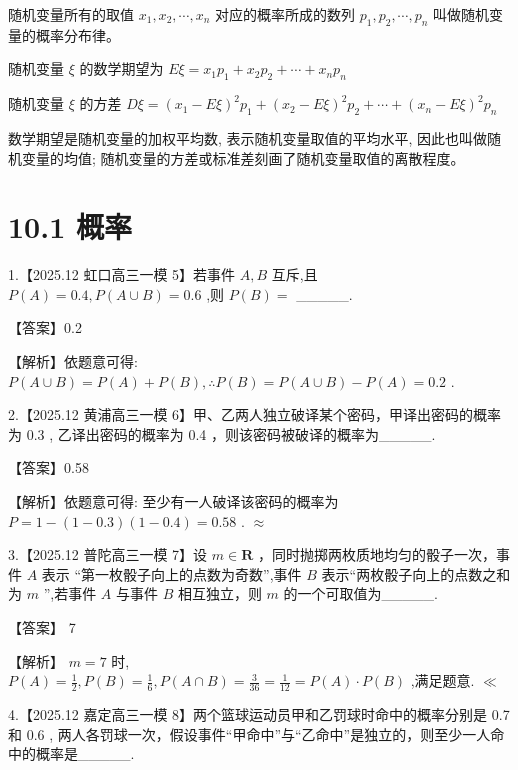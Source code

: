 \documentclass[10pt]{article}
\begin{document}
随机变量所有的取值 \({x}_{1},{x}_{2},\cdots ,{x}_{n}\) 对应的概率所成的数列 \({p}_{1},{p}_{2},\cdots ,{p}_{n}\) 叫做随机变量的概率分布律。

随机变量 \(\xi\) 的数学期望为 \({E\xi } = {x}_{1}{p}_{1} + {x}_{2}{p}_{2} + \cdots  + {x}_{n}{p}_{n}\)

随机变量 \(\xi\) 的方差 \({D\xi } = {\left( {x}_{1} - E\xi \right) }^{2}{p}_{1} + {\left( {x}_{2} - E\xi \right) }^{2}{p}_{2} + \cdots  + {\left( {x}_{n} - E\xi \right) }^{2}{p}_{n}\)

数学期望是随机变量的加权平均数, 表示随机变量取值的平均水平, 因此也叫做随机变量的均值; 随机变量的方差或标准差刻画了随机变量取值的离散程度。

\section*{10.1 概率}

1.【2025.12 虹口高三一模 5】若事件 \(A,B\) 互斥,且 \(P\left( A\right)  = {0.4},P\left( {A \cup  B}\right)  = {0.6}\) ,则 \(P\left( B\right)  =\) \_\_\_\_\_.

【答案】0.2

【解析】依题意可得: \(P\left( {A \cup  B}\right)  = P\left( A\right)  + P\left( B\right) ,\therefore P\left( B\right)  = P\left( {A \cup  B}\right)  - P\left( A\right)  = {0.2}\) .

2.【2025.12 黄浦高三一模 6】甲、乙两人独立破译某个密码，甲译出密码的概率为 0.3 , 乙译出密码的概率为 0.4 ，则该密码被破译的概率为\_\_\_\_\_.

【答案】0.58

【解析】依题意可得: 至少有一人破译该密码的概率为 \(P = 1 - \left( {1 - {0.3}}\right) \left( {1 - {0.4}}\right)  = {0.58}\) . \(\approx\)

3.【2025.12 普陀高三一模 7】设 \(m \in  \mathbf{R}\) ，同时抛掷两枚质地均匀的骰子一次，事件 \(A\) 表示 “第一枚骰子向上的点数为奇数”,事件 \(B\) 表示“两枚骰子向上的点数之和为 \(m\) ”,若事件 \(A\) 与事件 \(B\) 相互独立，则 \(m\) 的一个可取值为\_\_\_\_\_.

【答案】 7

【解析】 \(m = 7\) 时, \(P\left( A\right)  = \frac{1}{2},P\left( B\right)  = \frac{1}{6},P\left( {A \cap  B}\right)  = \frac{3}{36} = \frac{1}{12} = P\left( A\right)  \cdot  P\left( B\right)\) ,满足题意. \(\ll\)

4.【2025.12 嘉定高三一模 8】两个篮球运动员甲和乙罚球时命中的概率分别是 0.7 和 0.6 , 两人各罚球一次，假设事件“甲命中”与“乙命中”是独立的，则至少一人命中的概率是\_\_\_\_\_.
\end{document}
